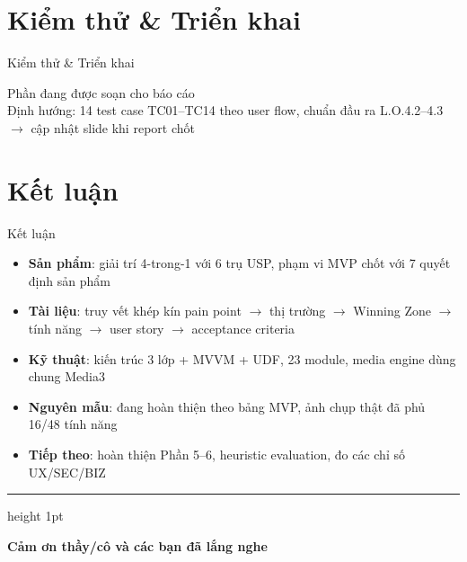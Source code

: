 \documentclass[aspectratio=169]{beamer}
\begin{document}
\section{Kiểm thử \& Triển khai}
\begin{frame}{Kiểm thử \& Triển khai}
  \begin{center}
    \vspace{10mm}
    {\Large\color{brandgray} Phần đang được soạn cho báo cáo}\\[3mm]
    {\small Định hướng: 14 test case TC01--TC14 theo user flow, chuẩn đầu ra L.O.4.2--4.3 $\rightarrow$ cập nhật slide khi report chốt}
  \end{center}
\end{frame}

\section{Kết luận}
\begin{frame}{Kết luận}
  \begin{itemize}
    \item \textbf{Sản phẩm}: giải trí 4-trong-1 với 6 trụ USP, phạm vi MVP chốt với 7 quyết định sản phẩm
    \item \textbf{Tài liệu}: truy vết khép kín pain point $\rightarrow$ thị trường $\rightarrow$ Winning Zone $\rightarrow$ tính năng $\rightarrow$ user story $\rightarrow$ acceptance criteria
    \item \textbf{Kỹ thuật}: kiến trúc 3 lớp + MVVM + UDF, 23 module, media engine dùng chung Media3
    \item \textbf{Nguyên mẫu}: đang hoàn thiện theo bảng MVP, ảnh chụp thật đã phủ 16/48 tính năng
    \item \textbf{Tiếp theo}: hoàn thiện Phần 5--6, heuristic evaluation, đo các chỉ số UX/SEC/BIZ
  \end{itemize}
  \vfill
  \begin{center}
    {\color{brandteal}\hrule height 1pt}
    \vspace{2mm}
    {\large\bfseries Cảm ơn thầy/cô và các bạn đã lắng nghe}
  \end{center}
\end{frame}
\end{document}
